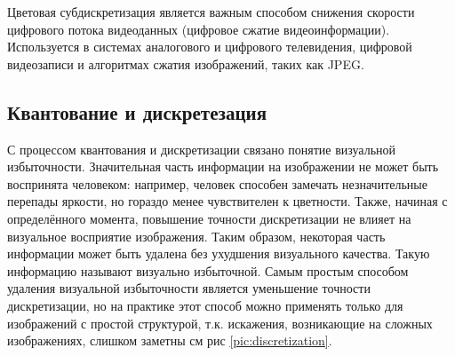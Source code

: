 Цветовая субдискретизация является важным способом снижения скорости цифрового потока видеоданных (цифровое сжатие видеоинформации). Используется в системах аналогового и цифрового телевидения, цифровой видеозаписи и алгоритмах сжатия изображений, таких как JPEG.

\subsection*{Квантование и дискретезация}
С процессом квантования и дискретизации связано понятие визуальной избыточности. Значительная часть информации на изображении не может быть воспринята человеком: например, человек способен замечать незначительные перепады яркости, но гораздо менее чувствителен к цветности. Также, начиная с определённого момента, повышение точности дискретизации не влияет на визуальное восприятие изображения. Таким образом, некоторая часть информации может быть удалена без ухудшения визуального качества. Такую информацию называют визуально избыточной.
Самым простым способом удаления визуальной избыточности является уменьшение точности дискретизации, но на практике этот способ можно применять только для изображений с простой структурой, т.к. искажения, возникающие на сложных изображениях, слишком заметны см рис \ref{pic:discretization}.

